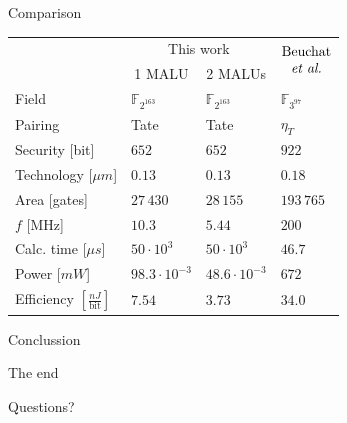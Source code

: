 \documentclass[svgnames, handout,t]{beamer}
\begin{document}
\begin{frame}{Comparison}
\vfill
\begin{center}
\small{\begin{tabular}{llll}
			\toprule
			&	\multicolumn{2}{c}{This work}	& \multirow{2}{*}{$\begin{array}{@{}c@{}}\text{Beuchat}\\\text{\emph{et al.}}\end{array}$}\\
			\cmidrule(r){2-3}
			& \multicolumn{1}{c}{1 MALU} & \multicolumn{1}{c}{2 MALUs} &\\
	 		\midrule
			Field																& $\mathbb{F}_{2^{163}}$	& $\mathbb{F}_{2^{163}}$	& $\mathbb{F}_{3^{97}}$\\
			Pairing															& Tate							& Tate							& $\eta_T$\\
			Security [bit]													& $652$							& $652$							& $922$\\
			Technology [$\mu m$]											& $0.13$							& $0.13$							& $0.18$\\
			Area [gates]													& $27\,430$						& $28\,155$						& $193\,765$\\
			$f$ [MHz]														& $10.3$							& $5.44$							& $200$\\
			Calc. time [$\mu s$]											& $50 \cdot 10^3$				& $50 \cdot 10^3$				& $46.7$\\
			Power [$mW$]													& $98.3 \cdot 10^{-3}$		& $48.6 \cdot 10^{-3}$		& $672$\\
			Efficiency $\left[ \frac{nJ}{\text{bit}}\right]$	& $7.54$							& $3.73$							& $34.0$\\
			\bottomrule		
		\end{tabular}}
\end{center}
\vfill
\end{frame}

\begin{frame}{Conclussion}
	
\end{frame}

\begin{frame}{The end}
	\begin{center}\LARGE Questions?\end{center}
\end{frame}
\end{document}
